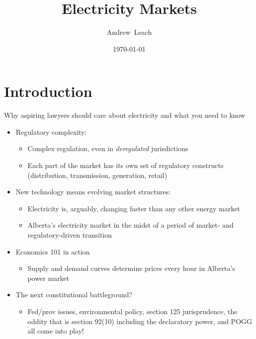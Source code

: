 \documentclass[aspectratio=169]{beamer}
\title[Electricity Slide Pack]
{%
  Electricity Markets%
}
\author[Leach]
{
  Andrew~Leach
}
\institute[2017]
{
  University of Alberta
 }
\date[5/28/2017]
{\today}
\renewcommand{\(}{\begin{columns}}
\renewcommand{\)}{\end{columns}}
\newcommand{\<}[1]{\begin{column}{#1}}
\renewcommand{\>}{\end{column}}
\begin{document}
\begin{frame}
   \titlepage
   \vfill
\end{frame}



\section{Introduction}




\begin{frame}{Why aspiring lawyers should care about electricity and what you need to know}
\begin{itemize}
\setlength\itemsep{.5em}
\item Regulatory complexity:
\begin{itemize}
\setlength\itemsep{.5em}
    \item Complex regulation, even in \textit{deregulated} jurisdictions
    \item Each part of the market has its own set of regulatory constructs (distribution, transmission, generation, retail)
\end{itemize}
\item New technology means evolving market structures:
\begin{itemize}
\setlength\itemsep{.5em}
\item Electricity is, arguably, changing faster than any other energy market
\item Alberta's electricity market in the midst of a period of market- and regulatory-driven transition
\end{itemize}
\item Economics 101 in action
\begin{itemize}
\setlength\itemsep{.5em}
\item Supply and demand curves determine prices every hour in Alberta's power market
\end{itemize}
\item The next constitutional battleground?
\begin{itemize}
\setlength\itemsep{.5em}
\item Fed/prov issues, environmental policy, section 125 jurisprudence, the oddity that is section 92(10) including the declaratory power, and POGG all come into play!
\end{itemize}
\end{itemize}
\vfill
\end{frame}
\end{document}

